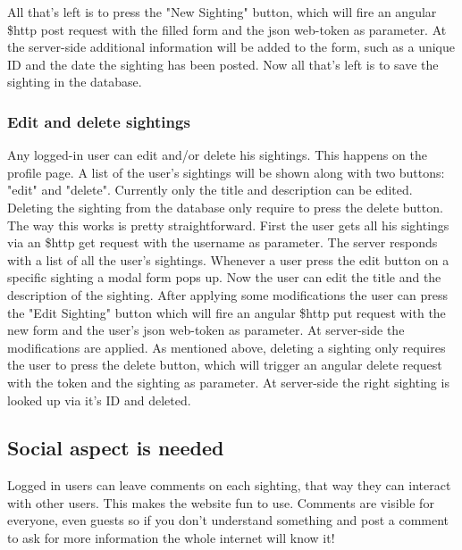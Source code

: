 \documentclass{article}
\begin{document}
All that's left is to press the "New Sighting" button, which will fire an angular \$http post request with the filled form and the json web-token as parameter. At the server-side additional information will be added to the form, such as a unique ID and the date the sighting has been posted. Now all that's left is to save the sighting in the database.

\subsubsection{Edit and delete sightings}
Any logged-in user can edit and/or delete his sightings. This happens on the profile page. A list of the user's sightings will be shown along with two buttons: "edit" and "delete". Currently only the title and description can be edited. Deleting the sighting from the database only require to press the delete button. \\

The way this works is pretty straightforward. 
First the user gets all his sightings via an \$http get request with the username as parameter. The server responds with a list of all the user's sightings. 
Whenever a user press the edit button on a specific sighting a modal form pops up. Now the user can edit the title and the description of the sighting. After applying some modifications the user can press the "Edit Sighting" button which will fire an angular \$http put request with the new form and the user's json web-token as parameter. At server-side the modifications are applied.
As mentioned above, deleting a sighting only requires the user to press the delete button, which will trigger an angular delete request with the token and the sighting as parameter. At server-side the right sighting is looked up via it's ID and deleted.

\subsection{Social aspect is needed}
Logged in users can leave comments on each sighting, that way they can interact with other users. This makes the website fun to use. Comments are visible for everyone, even guests so if you don't understand something and post a comment to ask for more information the whole internet will know it!
\end{document}
